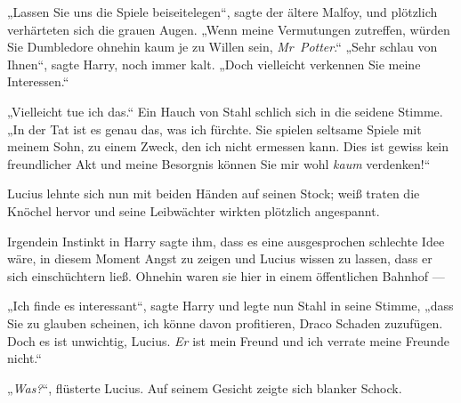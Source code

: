 „Lassen Sie uns die Spiele beiseitelegen“, sagte der ältere Malfoy, und plötzlich verhärteten sich die grauen Augen.
„Wenn meine Vermutungen zutreffen, würden Sie Dumbledore ohnehin kaum je zu Willen sein, \emph{Mr~Potter}.“
„Sehr schlau von Ihnen“, sagte Harry, noch immer kalt.
„Doch vielleicht verkennen Sie meine Interessen.“

„Vielleicht tue ich das.“ Ein Hauch von Stahl schlich sich in die seidene Stimme.
„In der Tat ist es genau das, was ich fürchte. Sie spielen seltsame Spiele mit meinem Sohn, zu einem Zweck, den ich nicht ermessen kann. Dies ist gewiss kein freundlicher Akt und meine Besorgnis können Sie mir wohl \emph{kaum} verdenken!“

Lucius lehnte sich nun mit beiden Händen auf seinen Stock; weiß traten die Knöchel hervor und seine Leibwächter wirkten plötzlich angespannt.

Irgendein Instinkt in Harry sagte ihm, dass es eine ausgesprochen schlechte Idee wäre, in diesem Moment Angst zu zeigen und Lucius wissen zu lassen, dass er sich einschüchtern ließ. Ohnehin waren sie hier in einem öffentlichen Bahnhof —

„Ich finde es interessant“, sagte Harry und legte nun Stahl in seine Stimme, „dass Sie zu glauben scheinen, ich könne davon profitieren, Draco Schaden zuzufügen. Doch es ist unwichtig, Lucius. \emph{Er} ist mein Freund und ich verrate meine Freunde nicht.“

„\emph{Was?}“, flüsterte Lucius. Auf seinem Gesicht zeigte sich blanker Schock.

